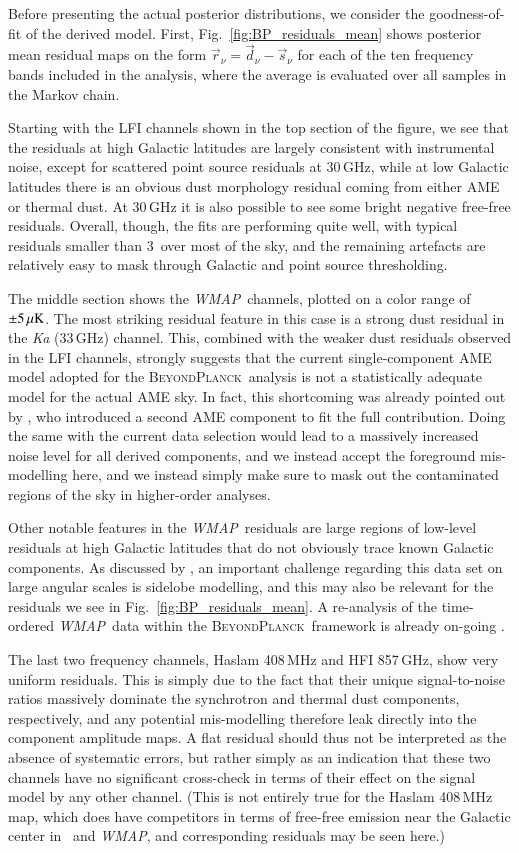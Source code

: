 \documentclass[twocolumn]{aa}
\def\WMAP{\emph{WMAP}}
\renewcommand{\d}[0]{\vec{d}}
\newcommand{\s}[0]{\vec{s}}
\renewcommand{\r}[0]{\vec{r}}
\newcommand{\BP}{\textsc{BeyondPlanck}}
\begin{document}
Before presenting the actual posterior distributions, we consider the
goodness-of-fit of the derived model. First,
Fig.~\ref{fig:BP_residuals_mean} shows posterior mean residual maps on
the form $\r_{\nu} = \d_{\nu}-\s_{\nu}$ for each of the ten frequency
bands included in the analysis, where the average is evaluated over
all samples in the Markov chain.

Starting with the LFI channels shown in the top section of the figure,
we see that the residuals at high Galactic latitudes are largely
consistent with instrumental noise, except for scattered point source
residuals at 30\,GHz, while at low Galactic latitudes there is an
obvious dust morphology residual coming from either AME or thermal
dust. At 30\,GHz it is also possible to see some bright negative
free-free residuals. Overall, though, the fits are performing quite
well, with typical residuals smaller than 3\muK\ over most of the sky,
and the remaining artefacts are relatively easy to mask through
Galactic and point source thresholding.

The middle section shows the \WMAP\ channels, plotted on a color range
of $\pm5\muK$. The most striking residual feature in this case is a
strong dust residual in the \textit{Ka} (33\,GHz) channel. This, combined
with the weaker dust residuals observed in the LFI channels, strongly
suggests that the current single-component AME model adopted for the
\BP\ analysis is not a statistically adequate model for the actual AME
sky. In fact, this shortcoming was already pointed out by
\citet{planck2014-a12}, who introduced a second AME component to fit
the full contribution. Doing the same with the current data selection
would lead to a massively increased noise level for all derived
components, and we instead accept the foreground mis-modelling here,
and we instead simply make sure to mask out the contaminated regions
of the sky in higher-order analyses.

Other notable features in the \WMAP\ residuals are large regions of
low-level residuals at high Galactic latitudes that do not obviously
trace known Galactic components. As discussed by \citet{barnes2003},
an important challenge regarding this data set on large angular scales
is sidelobe modelling, and this may also be relevant for the residuals
we see in Fig.~\ref{fig:BP_residuals_mean}. A re-analysis of the
time-ordered \WMAP\ data within the \BP\ framework is already
on-going \citep{bp17}. 

The last two frequency channels, Haslam 408\,MHz and HFI 857\,GHz,
show very uniform residuals. This is simply due to the fact that their
unique signal-to-noise ratios massively dominate the synchrotron and
thermal dust components, respectively, and any potential mis-modelling
therefore leak directly into the component amplitude maps. A flat
residual should thus not be interpreted as the absence of systematic
errors, but rather simply as an indication that these two channels
have no significant cross-check in terms of their effect on the signal
model by any other channel. (This is not entirely true for the Haslam
408\,MHz map, which does have competitors in terms of free-free
emission near the Galactic center in \Planck\ and \WMAP, and
corresponding residuals may be seen here.)
\end{document}
